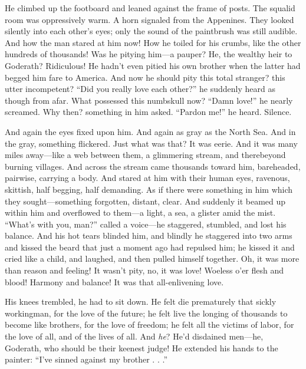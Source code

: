 \documentclass[12pt,a4paper]{article}
\begin{document}
He climbed up the footboard and leaned against the frame of posts. The squalid room was oppressively warm. A horn signaled from the Appenines. They looked silently into each other’s eyes; only the sound of the paintbrush was still audible. And how the man stared at him now! How he toiled for his crumbs, like the other hundreds of thousands! Was he pitying him—a pauper? He, the wealthy heir to Goderath? Ridiculous! He hadn’t even pitied his own brother when the latter had begged him fare to America. And now he should pity this total stranger? this utter incompetent? “Did you really love each other?” he suddenly heard as though from afar. What possessed this numbskull now? “Damn love!” he nearly screamed. Why then? something in him asked. “Pardon me!” he heard. Silence.

And again the eyes fixed upon him. And again as gray as the North Sea. And in the gray, something flickered. Just what was that? It was eerie. And it was many miles away—like a web between them, a glimmering stream, and therebeyond burning villages. And across the stream came thousands toward him, bareheaded, pairwise, carrying a body. And stared at him with their human eyes, ravenous, skittish, half begging, half demanding. As if there were something in him which they sought—something forgotten, distant, clear. And suddenly it beamed up within him and overflowed to them—a light, a sea, a glister amid the mist. “What’s with you, man?” called a voice—he staggered, stumbled, and lost his balance. And his hot tears blinded him, and blindly he staggered into two arms and kissed the beard that just a moment ago had repulsed him; he kissed it and cried like a child, and laughed, and then pulled himself together. Oh, it was more than reason and feeling! It wasn’t pity, no, it was love! Woeless o’er flesh and blood! Harmony and balance! It was that all-enlivening love.

His knees trembled, he had to sit down. He felt die prematurely that sickly workingman, for the love of the future; he felt live the longing of thousands to become like brothers, for the love of freedom; he felt all the victims of labor, for the love of all, and of the lives of all. And \textit{he}? He’d disdained men—he, Goderath, who should be their keenest judge! He extended his hands to the painter: “I’ve sinned against my brother . . .”
\end{document}
